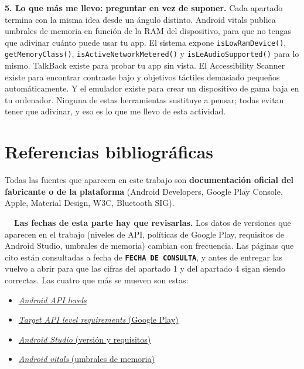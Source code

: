 \documentclass[11pt,a4paper]{article}
\newcommand{\code}[1]{\texttt{\color{ink}#1}}
\begin{document}
	\textbf{5. Lo que más me llevo: preguntar en vez de suponer.} Cada apartado termina con la misma idea desde un ángulo distinto. Android vitals publica umbrales de memoria en función de la RAM del dispositivo, para que no tengas que adivinar cuánto puede usar tu app. El sistema expone \code{isLowRamDevice()}, \code{getMemoryClass()}, \code{isActiveNetworkMetered()} y \code{isLeAudioSupported()} para lo mismo. TalkBack existe para probar tu app sin vista. El Accessibility Scanner existe para encontrar contraste bajo y objetivos táctiles demasiado pequeños automáticamente. Y el emulador existe para crear un dispositivo de gama baja en tu ordenador. Ninguna de estas herramientas sustituye a pensar; todas evitan tener que adivinar, y eso es lo que me llevo de esta actividad.
	
	\newpage
	\section*{Referencias bibliográficas}
	
	Todas las fuentes que aparecen en este trabajo son \textbf{documentación oficial del fabricante o de la plataforma} (Android Developers, Google Play Console, Apple, Material Design, W3C, Bluetooth SIG).
	
	\begin{warnbox}
		\textbf{\color{accent!80!black}\faExclamationTriangle\ \ Las fechas de esta parte hay que revisarlas.}
		Los datos de versiones que aparecen en el trabajo (niveles de API, políticas de Google Play,
		requisitos de Android Studio, umbrales de memoria) cambian con frecuencia. Las páginas que cito
		están consultadas a fecha de \textbf{\texttt{FECHA DE CONSULTA}}, y antes de entregar las vuelvo
		a abrir para que las cifras del apartado 1 y del apartado 4 sigan siendo correctas. Las cuatro que
		más se mueven son estas:
		\begin{itemize}[leftmargin=*,itemsep=0.15em,topsep=0.2em]
			\item \href{https://developer.android.com/tools/releases/platforms}{\emph{Android API levels}}
			\item \href{https://support.google.com/googleplay/android-developer/answer/11926878}{\emph{Target API level requirements} (Google Play)}
			\item \href{https://developer.android.com/studio}{\emph{Android Studio} (versión y requisitos)}
			\item \href{https://developer.android.com/topic/performance/vitals}{\emph{Android vitals} (umbrales de memoria)}
		\end{itemize}
	\end{warnbox}
	
\end{document}
